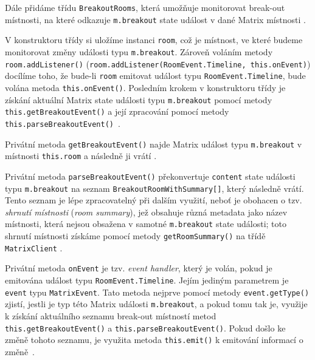 Dále přidáme třídu \texttt{BreakoutRooms}, která umožňuje
monitorovat break-out místnosti, na které odkazuje \texttt{m.breakout}
state událost v dané Matrix místnosti \cite{GitHub-MatrixJSSDK-BreakoutRooms}.

V konstruktoru třídy si uložíme instanci \texttt{room}, což je
místnost, ve které budeme monitorovat změny události typu
\texttt{m.breakout}. Zároveň voláním metody
\texttt{room.addListener()}
(\texttt{room.addListener(RoomEvent.Timeline, this.onEvent)})
docílíme toho, že bude-li \texttt{room} emitovat událost typu
\texttt{RoomEvent.Timeline}, bude volána metoda
\texttt{this.onEvent()}. Posledním krokem v konstruktoru třídy
je získání aktuální Matrix state události typu \texttt{m.breakout}
pomocí metody \texttt{this.getBreakoutEvent()} a její zpracování
pomocí metody
\texttt{this.parseBreakoutEvent()}~\cite{GitHub-MatrixJSSDK-BreakoutRooms}.

Privátní metoda \texttt{getBreakoutEvent()} najde Matrix událost
typu \texttt{m.breakout} v místnosti
\texttt{this.room} a následně ji vrátí
\cite{GitHub-MatrixJSSDK-BreakoutRooms}.

Privátní metoda \texttt{parseBreakoutEvent()} překonvertuje
\texttt{content} state události typu \texttt{m.breakout} na
seznam \texttt{BreakoutRoomWithSummary[]}, který následně vrátí.
Tento seznam je lépe zpracovatelný při dalším využití, neboť je obohacen o tzv.
\textit{shrnutí místnosti} (\textit{room summary}), jež obsahuje různá
metadata jako název místnosti, která nejsou obsažena v samotné
\texttt{m.breakout} state události; toto shrnutí místnosti získáme
pomocí metody \texttt{getRoomSummary()} na třídě
\texttt{MatrixClient} \cite{GitHub-MatrixJSSDK-BreakoutRooms}.

Privátní metoda \texttt{onEvent} je tzv. \textit{event handler},
který je volán, pokud je emitována událost typu
\texttt{RoomEvent.Timeline}. Jejím jediným parametrem je
\texttt{event} typu \texttt{MatrixEvent}. Tato
metoda nejprve pomocí metody \texttt{event.getType()} zjistí,
jestli je typ této Matrix události \texttt{m.breakout}, a pokud tomu
tak je, využije k získání aktuálního seznamu break-out místností metod
\texttt{this.getBreakoutEvent()} a
\texttt{this.parseBreakoutEvent()}. Pokud došlo ke změně tohoto
seznamu, je využita metoda \texttt{this.emit()} k emitování
informací o změně~\cite{GitHub-MatrixJSSDK-BreakoutRooms}.


